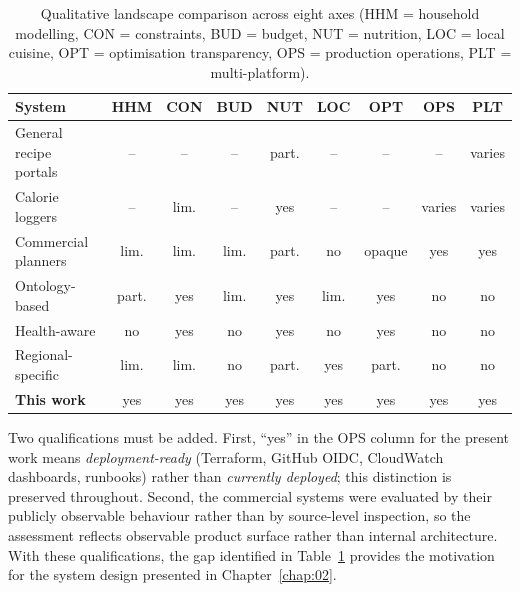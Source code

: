 \begin{table}[H]
\centering
\small
\caption{Qualitative landscape comparison across eight axes (HHM = household modelling, CON = constraints, BUD = budget, NUT = nutrition, LOC = local cuisine, OPT = optimisation transparency, OPS = production operations, PLT = multi-platform).}
\label{tab:landscape}
\begin{tabular}{|l|c|c|c|c|c|c|c|c|}
\hline
System & HHM & CON & BUD & NUT & LOC & OPT & OPS & PLT \\
\hline
General recipe portals & -- & -- & -- & part. & -- & -- & -- & varies \\
Calorie loggers & -- & lim. & -- & yes & -- & -- & varies & varies \\
Commercial planners & lim. & lim. & lim. & part. & no & opaque & yes & yes \\
Ontology-based \cite{al_nazer2014,bianchini2015} & part. & yes & lim. & yes & lim. & yes & no & no \\
Health-aware \cite{jung2016,phanich2010} & no & yes & no & yes & no & yes & no & no \\
Regional-specific \cite{ribeiro2018,mao2016} & lim. & lim. & no & part. & yes & part. & no & no \\
\textbf{This work} & yes & yes & yes & yes & yes & yes & yes & yes \\
\hline
\end{tabular}
\end{table}

Two qualifications must be added. First, ``yes'' in the OPS column for the present work means \emph{deployment-ready} (Terraform, GitHub OIDC, CloudWatch dashboards, runbooks) rather than \emph{currently deployed}; this distinction is preserved throughout. Second, the commercial systems were evaluated by their publicly observable behaviour rather than by source-level inspection, so the assessment reflects observable product surface rather than internal architecture. With these qualifications, the gap identified in Table~\ref{tab:landscape} provides the motivation for the system design presented in Chapter~\ref{chap:02}.

\clearpage
